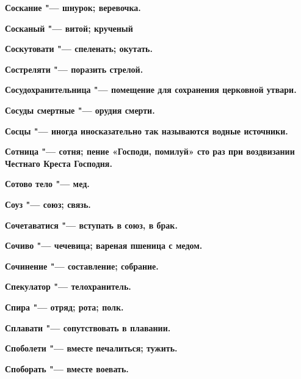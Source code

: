 \begin{multicols}{2}
\bfseries Соскание\normalfont{} "--- шнурок; веревочка. 




\bfseries Сосканый\normalfont{} "--- витой; крученый 




\bfseries Соскутовати\normalfont{} "--- спеленать; окутать. 




\bfseries Состреляти\normalfont{} "--- поразить стрелой. 




\bfseries Сосудохранительница\normalfont{} "--- помещение для сохранения церковной утвари. 




\bfseries Сосуды смертные\normalfont{} "--- орудия смерти. 




\bfseries Сосцы\normalfont{} "--- иногда иносказательно так называются водные источники. 




\bfseries Сотница\normalfont{} "--- сотня; пение «Господи, помилуй» сто раз при воздвизании Честнаго Креста Господня. 




\bfseries Сотово тело\normalfont{} "--- мед. 




\bfseries Соуз\normalfont{} "--- союз; связь. 




\bfseries Сочетаватися\normalfont{} "--- вступать в союз, в брак. 




\bfseries Сочиво\normalfont{} "--- чечевица; вареная пшеница с медом. 




\bfseries Сочинение\normalfont{} "--- составление; собрание. 




\bfseries Спекулатор\normalfont{} "--- телохранитель. 




\bfseries Спира\normalfont{} "--- отряд; рота; полк. 




\bfseries Сплавати\normalfont{} "--- сопутствовать в плавании. 




\bfseries Споболети\normalfont{} "--- вместе печалиться; тужить. 




\bfseries Споборать\normalfont{} "--- вместе воевать. 





\end{multicols}
